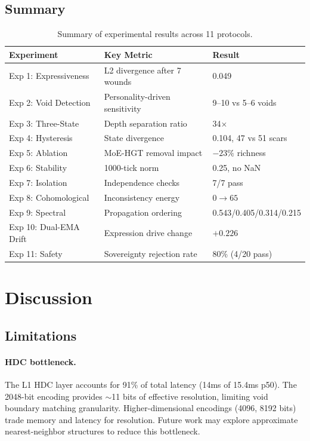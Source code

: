 \documentclass[11pt]{article}
\begin{document}
\subsection{Summary}

\begin{table}[H]
\centering
\small
\begin{tabular}{lll}
\toprule
\textbf{Experiment} & \textbf{Key Metric} & \textbf{Result} \\
\midrule
Exp 1: Expressiveness & L2 divergence after 7 wounds & 0.049 \\
Exp 2: Void Detection & Personality-driven sensitivity & 9--10 vs 5--6 voids \\
Exp 3: Three-State & Depth separation ratio & 34$\times$ \\
Exp 4: Hysteresis & State divergence & 0.104, 47 vs 51 scars \\
Exp 5: Ablation & MoE-HGT removal impact & $-23\%$ richness \\
Exp 6: Stability & 1000-tick norm & 0.25, no NaN \\
Exp 7: Isolation & Independence checks & 7/7 pass \\
Exp 8: Cohomological & Inconsistency energy & $0 \to 65$ \\
Exp 9: Spectral & Propagation ordering & 0.543/0.405/0.314/0.215 \\
Exp 10: Dual-EMA Drift & Expression drive change & $+0.226$ \\
Exp 11: Safety & Sovereignty rejection rate & 80\% (4/20 pass) \\
\bottomrule
\end{tabular}
\caption{Summary of experimental results across 11 protocols.}
\label{tab:results}
\end{table}

\section{Discussion}
\label{sec:discussion}

\subsection{Limitations}

\paragraph{HDC bottleneck.} The L1 HDC layer accounts for 91\% of total latency (14ms of 15.4ms p50). The 2048-bit encoding provides $\sim$11 bits of effective resolution, limiting void boundary matching granularity. Higher-dimensional encodings (4096, 8192 bits) trade memory and latency for resolution. Future work may explore approximate nearest-neighbor structures to reduce this bottleneck.
\end{document}
